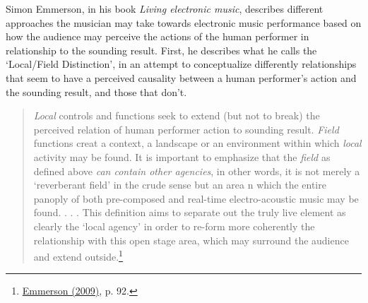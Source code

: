 Simon Emmerson, in his book \emph{Living electronic music}, describes different approaches the musician may take towards electronic music performance based on how the audience may perceive the actions of the human performer in relationship to the sounding result. First, he describes what he calls the `Local/Field Distinction', in an attempt to conceptualize differently relationships that seem to have a perceived causality between a human performer's action and the sounding result, and those that don't.
\begin{quote}
\emph{Local} controls and functions seek to extend (but not to break) the perceived relation of human performer action to sounding result. \emph{Field} functions creat a context, a landscape or an environment within which \emph{local} activity may be found. It is important to emphasize that the \emph{field} as defined above \emph{can contain other agencies}, in other words, it is not merely a `reverberant field' in the crude sense but an area n which the entire panoply of both pre-composed and real-time electro-acoustic music may be found. . . . This definition aims to separate out the truly live element as clearly the `local agency' in order to re-form more coherently the relationship with this open stage area, which may surround the audience and extend outside.\footnote {\hyperlink{emmersonliving}{Emmerson (2009)}, p. 92.}
\end{quote}
